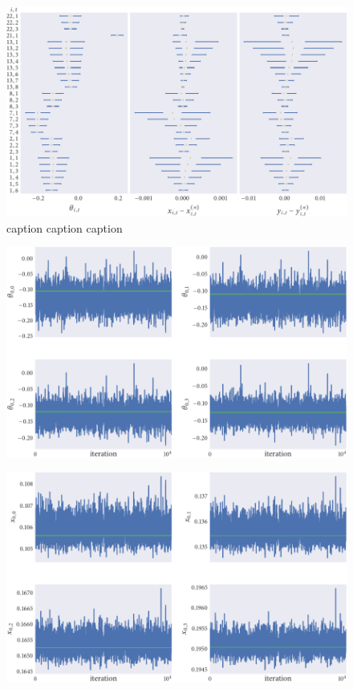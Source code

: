 \begin{figure}[tbp]
  \includegraphics{beg/summary.pdf}
  \caption{caption caption caption}
  \label{fig:beg_summary}
\end{figure}

\begin{figure}[tbp]
  \includegraphics{beg/dir_trace.pdf}
  \caption{}
  \label{fig:beg_dir_trace}
\end{figure}

\begin{figure}[tbp]
  \includegraphics{beg/x_trace.pdf}
  \caption{}
  \label{fig:beg_x_trace}
\end{figure}

